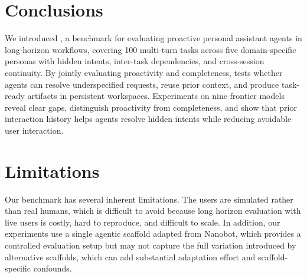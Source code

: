 
\section{Conclusions}
\label{sec:conclusions}

We introduced {\bench}, a benchmark for evaluating proactive personal assistant agents in long-horizon workflows, covering 100 multi-turn tasks across five domain-specific personas with hidden intents, inter-task dependencies, and cross-session continuity. By jointly evaluating proactivity and completeness, {\bench} tests whether agents can resolve underspecified requests, reuse prior context, and produce task-ready artifacts in persistent workspaces.
Experiments on nine frontier models reveal clear gaps, distinguish proactivity from completeness, and show that prior interaction history helps agents resolve hidden intents while reducing avoidable user interaction.

\section{Limitations}
\label{sec:limitations}

Our benchmark has several inherent limitations. The users are simulated rather than real humans, which is difficult to avoid because long horizon evaluation with live users is costly, hard to reproduce, and difficult to scale.
In addition, our experiments use a single agentic scaffold adapted from Nanobot, which provides a controlled evaluation setup but may not capture the full variation introduced by alternative scaffolds, which can add substantial adaptation effort and scaffold-specific confounds.
